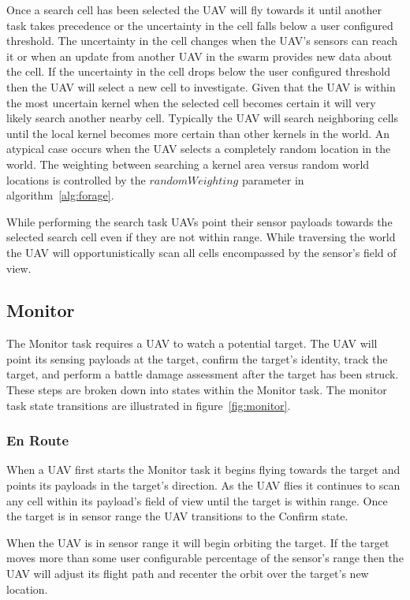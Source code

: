 Once a search cell has been selected the UAV will fly towards it until another task takes precedence or the uncertainty in the cell falls below a user configured threshold.  The uncertainty in the cell changes when the UAV's sensors can reach it or when an update from another UAV in the swarm provides new data about the cell. If the uncertainty in the cell drops below the user configured threshold then the UAV will select a new cell to investigate.  Given that the UAV is within the most uncertain kernel when the selected cell becomes certain it will very likely search another nearby cell.  Typically the UAV will search neighboring cells until the local kernel becomes more certain than other kernels in the world.  An atypical case occurs when the UAV selects a completely random location in the world.  The weighting between searching a kernel area versus random world locations is controlled by the $randomWeighting$ parameter in algorithm~\ref{alg:forage}.

While performing the search task UAVs point their sensor payloads towards the selected search cell even if they are not within range.  While traversing the world the UAV will opportunistically scan all cells encompassed by the sensor's field of view.


\subsection{Monitor}
The Monitor task requires a UAV to watch a potential target.  The UAV will point its sensing payloads at the target, confirm the target's identity, track the target, and perform a battle damage assessment after the target has been struck.  These steps are broken down into states within the Monitor task.  The monitor task state transitions are illustrated in figure~\ref{fig:monitor}.

\subsubsection{En Route}
When a UAV first starts the Monitor task it begins flying towards the target and points its payloads in the target's direction.  As the UAV flies it continues to scan any cell within its payload's field of view until the target is within range.  Once the target is in sensor range the UAV transitions to the Confirm state.  

When the UAV is in sensor range it will begin orbiting the target.  If the target moves more than some user configurable percentage of the sensor's range then the UAV will adjust its flight path and recenter the orbit over the target's new location.

